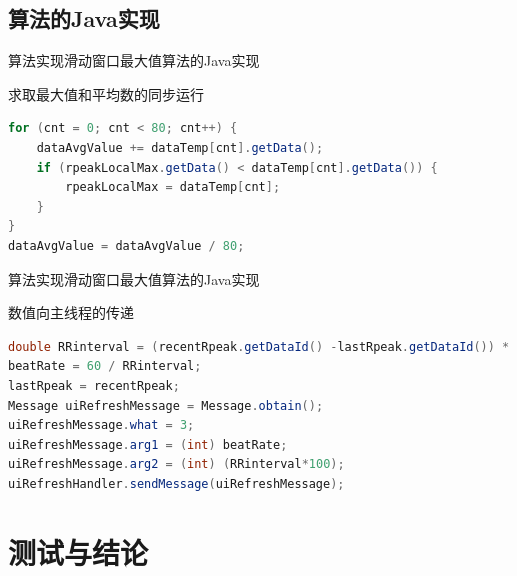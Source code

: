 \documentclass[aspectratio=43,fleqn]{beamer}
\begin{document}
\subsection{算法的Java实现}
\begin{frame}[fragile]{算法实现}{滑动窗口最大值算法的Java实现}
\begin{block}{求取最大值和平均数的同步运行}
\begin{center}
\begin{lstlisting}[language=java]
for (cnt = 0; cnt < 80; cnt++) {
    dataAvgValue += dataTemp[cnt].getData();
    if (rpeakLocalMax.getData() < dataTemp[cnt].getData()) {
        rpeakLocalMax = dataTemp[cnt];
    }
}
dataAvgValue = dataAvgValue / 80;
\end{lstlisting}
\end{center}
\end{block}
\end{frame}

\begin{frame}[fragile]{算法实现}{滑动窗口最大值算法的Java实现}
\begin{block}{数值向主线程的传递}
\begin{center}
\begin{lstlisting}[language=java]
double RRinterval = (recentRpeak.getDataId() -lastRpeak.getDataId()) * EcgData.RECORDRATE;
beatRate = 60 / RRinterval;
lastRpeak = recentRpeak;
Message uiRefreshMessage = Message.obtain();
uiRefreshMessage.what = 3;
uiRefreshMessage.arg1 = (int) beatRate;
uiRefreshMessage.arg2 = (int) (RRinterval*100);
uiRefreshHandler.sendMessage(uiRefreshMessage);
\end{lstlisting}
\end{center}
\end{block}
\end{frame}

\section{测试与结论}
\end{document}
